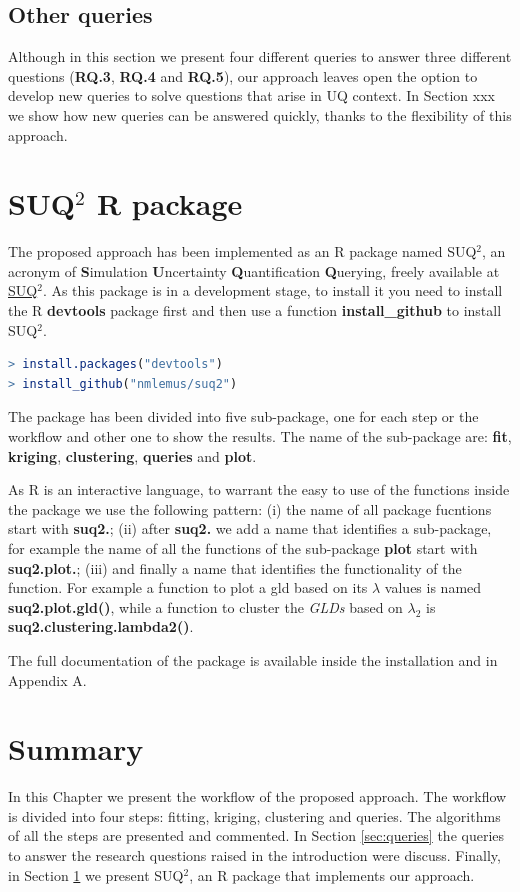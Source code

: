 \subsection{Other queries}
Although in this section we present four different queries to answer three different questions (\textbf{RQ.3}, \textbf{RQ.4} and \textbf{RQ.5}), our approach leaves open the option to develop new queries to solve questions that arise in UQ context. In Section xxx  we show how new queries can be answered quickly, thanks to the flexibility of this approach.

\section{SUQ$^2$ R package}\label{sec:suq2}
The proposed approach has been implemented as an R package named SUQ$^2$, an acronym of \textbf{S}imulation \textbf{U}ncertainty \textbf{Q}uantification \textbf{Q}uerying, freely available at \href{https://github.com/nmlemus/suq2}{SUQ$^2$}. As this package is in a development stage, to install it you need to install the R \textbf{devtools} package first and then use a function \textbf{install\_github} to install SUQ$^2$.

\begin{lstlisting}[language=r]
> install.packages("devtools")
> install_github("nmlemus/suq2")
\end{lstlisting}

The package has been divided into five sub-package, one for each step or the workflow and other one to show the results. The name of the sub-package are: \textbf{fit}, \textbf{kriging}, \textbf{clustering}, \textbf{queries} and \textbf{plot}.

As R is an interactive language, to warrant the easy to use of the functions inside the package we use the following pattern: (i) the name of all package fucntions start with \textbf{suq2.}; (ii) after \textbf{suq2.} we add a name that identifies a sub-package, for example the name of all the functions of the sub-package \textbf{plot} start with \textbf{suq2.plot.}; (iii) and finally a name that identifies the functionality of the function. For example a function to plot a gld based on its $\lambda$ values is named \textbf{suq2.plot.gld()}, while a function to cluster the \textit{GLDs} based on $\lambda_{2}$ is \textbf{suq2.clustering.lambda2()}.

The full documentation of the package is available inside the installation and in Appendix A.

\section{Summary}\label{sec:approach_summary}
In this Chapter we present the workflow of the proposed approach. The workflow is divided into four steps: fitting, kriging, clustering and queries. The algorithms of all the steps are presented and commented. In Section \ref{sec:queries} the queries to answer the research questions raised in the introduction were discuss. Finally, in Section \ref{sec:suq2} we present SUQ$^2$, an R package that implements our approach.  